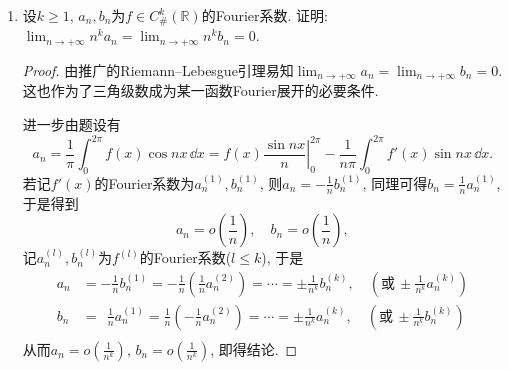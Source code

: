 \begin{quiza}
\begin{enumerate}
\begin{proof}[解答]
\[=\int_{0}^{\pi}\frac{\sin(2n+1)x}{\sin x}\,\dd x,\]
注意到\[\frac{\sin(2n+1)t}{\sin t}=1+2\sum_{k=1}^{n}\cos(2kt),\]
从而\[\int_{0}^{\pi}\frac{\sin 2nx\cdot\cos x}{\sin x}\,\dd x
=\int_{0}^{\pi}\left(1+2\sum_{k=1}^{\infty}\cos 2kt\right)\dd t=\pi.\]
故\(a_n=\frac{1}{n}\).
\[\begin{split}
b_n&=-\frac{1}{\pi}\int_{0}^{2\pi}\ln\left(2\sin\frac{x}{2}\right)\sin nx\,\dd x\\
&=-\frac{1}{\pi}\int_{0}^{2\pi}\left(\ln 2+\ln\sin\frac{x}{2}\right)\sin nx\,\dd x\\
&=-\frac{1}{\pi}\left(\int_{0}^{2\pi}\ln 2\cdot\sin nx\,\dd x+\int_{0}^{2\pi}\ln\sin\frac{x}{2}\cdot\sin nx\,\dd x\right)\\
&=-\frac{1}{\pi}\int_{0}^{2\pi}\ln\sin\frac{x}{2}\cdot\sin nx\,\dd x\\
&=-\frac{2}{\pi}\int_{0}^{\pi}\ln\sin x\cdot\sin 2nx\,\dd x\\
&=-\frac{2}{\pi}\int_{0}^{\pi}\ln\sin x\cdot\sin2n(\pi-x)\,\dd x\\
&=\frac{2}{\pi}\int_{0}^{\pi}\ln\sin x\cdot\sin 2nx\,\dd x=0.
\end{split}\]
即\(f(x)\sim\sum_{n=1}^{\infty}\frac{\cos nx}{n}.\)
\end{proof}
\item 设\(k\geqslant 1\), \(a_n,b_n\)为\(f\in C_{\#}^k(\mathbb{R})\)的Fourier系数. 
证明: \(\lim_{n\rightarrow+\infty}n^ka_n=\lim_{n\rightarrow+\infty}n^kb_n=0.\)
\begin{proof}
由推广的Riemann--Lebesgue引理易知\(\lim_{n\rightarrow+\infty}a_n=\lim_{n\rightarrow+\infty}b_n=0\). 
这也作为了三角级数成为某一函数Fourier展开的必要条件. 

进一步由题设有\[a_n=\frac{1}{\pi}\int_{0}^{2\pi}f(x)\cos nx\,\dd x
=\left. f(x)\frac{\sin nx}{n}\right|^{2\pi}_{0}-\frac{1}{n\pi}\int_{0}^{2\pi}f'(x)\sin nx\,\dd x.\]
若记\(f'(x)\)的Fourier系数为\(a^{(1)}_n,b^{(1)}_n\), 则\(a_n=-\frac{1}{n}b^{(1)}_n\), 同理可得\(b_n=\frac{1}{n}a^{(1)}_n\), 于是得到
\[a_n=o\left(\frac{1}{n}\right),\quad b_n=o\left(\frac{1}{n}\right),\]
记\(a_n^{(l)},b_n^{(l)}\)为\(f^{(l)}\)的Fourier系数(\(l\leqslant k\)), 于是
\[\begin{split}
a_n&=-\frac{1}{n}b_n^{(1)}=-\frac{1}{n}\left(\frac{1}{n}a_n^{(2)}\right)=\cdots=\pm\frac{1}{n^k}b_n^{(k)},\quad\left(\text{或}\,\pm\frac{1}{n^k}a_n^{(k)}\right)\\
b_n&=\ \ \frac{1}{n}a_n^{(1)}=\frac{1}{n}\left(-\frac{1}{n}a_n^{(2)}\right)=\cdots=\pm\frac{1}{n^k}a_n^{(k)},\quad\left(\text{或}\,\pm\frac{1}{n^k}b_n^{(k)}\right)\\
\end{split}\]
从而\(a_n=o\left(\frac{1}{n^k}\right),\,b_n=o\left(\frac{1}{n^k}\right)\), 即得结论.
\end{proof}
\end{enumerate}
\end{quiza}

